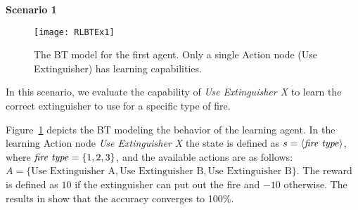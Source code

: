\textbf{Scenario 1}
\label{sec:experiments_scenario1}

\begin{figure}
  \centering
  \texttt{[image: RLBTEx1]}
  \caption{The BT model for the first agent. Only a single Action node (Use Extinguisher) has learning capabilities.}
  \label{fig:model_scenario1}
\end{figure}

In this scenario, we evaluate  the capability of  \emph{Use Extinguisher X} to learn the correct extinguisher to use for a specific type of fire.

Figure~\ref{fig:model_scenario1} depicts the BT modeling the behavior of the learning agent. In the learning Action node \emph{Use Extinguisher X} the state is defined as  $s = \langle \text{\emph{fire type}} \rangle$, where $\text{\emph{fire type}} = \{1, 2, 3\}$, and the available actions are as follows:\\ $A = \{\mbox{Use Extinguisher A}, \mbox{Use Extinguisher B}, \mbox{Use Extinguisher B}\}$. The reward is defined as  $10$ if the extinguisher can put out the fire and $-10$ otherwise.
%
The results in \cite{pereira2015framework} show that the accuracy converges to 100\%.

%



